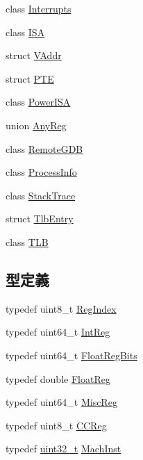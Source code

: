\begin{DoxyCompactItemize}
class \hyperlink{classPowerISA_1_1Interrupts}{Interrupts}
\item 
class \hyperlink{classPowerISA_1_1ISA}{ISA}
\item 
struct \hyperlink{structPowerISA_1_1VAddr}{VAddr}
\item 
struct \hyperlink{structPowerISA_1_1PTE}{PTE}
\item 
class \hyperlink{classPowerISA_1_1PowerISA}{PowerISA}
\item 
union \hyperlink{unionPowerISA_1_1AnyReg}{AnyReg}
\item 
class \hyperlink{classPowerISA_1_1RemoteGDB}{RemoteGDB}
\item 
class \hyperlink{classPowerISA_1_1ProcessInfo}{ProcessInfo}
\item 
class \hyperlink{classPowerISA_1_1StackTrace}{StackTrace}
\item 
struct \hyperlink{structPowerISA_1_1TlbEntry}{TlbEntry}
\item 
class \hyperlink{classPowerISA_1_1TLB}{TLB}
\end{DoxyCompactItemize}
\subsection*{型定義}
\begin{DoxyCompactItemize}
\item 
typedef uint8\_\-t \hyperlink{namespacePowerISA_a1c4e98d2e6a11a837bf9ccd20dd32f8a}{RegIndex}
\item 
typedef uint64\_\-t \hyperlink{namespacePowerISA_a0e080577527fb3e9685399f75b5caf15}{IntReg}
\item 
typedef uint64\_\-t \hyperlink{namespacePowerISA_a6905e424d12491fe126e1a22a9c8d655}{FloatRegBits}
\item 
typedef double \hyperlink{namespacePowerISA_a06fae4f187c7c94b8b0046dd6802be48}{FloatReg}
\item 
typedef uint64\_\-t \hyperlink{namespacePowerISA_aa16539aa6584fd12f7d6fa868f75b4de}{MiscReg}
\item 
typedef uint8\_\-t \hyperlink{namespacePowerISA_a5834599c0196ce4accda8049e7320621}{CCReg}
\item 
typedef \hyperlink{Type_8hh_a435d1572bf3f880d55459d9805097f62}{uint32\_\-t} \hyperlink{namespacePowerISA_a301c22ea09fa33dcfe6ddf22f203699c}{MachInst}
\end{DoxyCompactItemize}
